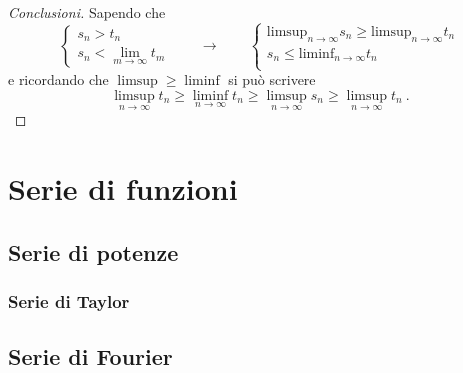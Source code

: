 \begin{proof}[Conclusioni]
Sapendo che
    \begin{equation}
        \begin{cases}
            s_n > t_n \\
            s_n < \lim_{m \rightarrow \infty} t_m
        \end{cases} \qquad \rightarrow \qquad
        \begin{cases}
            \text{limsup}_{n\rightarrow\infty} s_n \ge \text{limsup}_{n\rightarrow\infty} t_n \\
            s_n \le \text{liminf}_{n\rightarrow\infty} t_n \\
        \end{cases}
    \end{equation}
e ricordando che $\limsup \ge \liminf$ si può scrivere
\begin{equation}
    \limsup_{n\rightarrow\infty} t_n \ge \liminf_{n\rightarrow\infty} t_n \ge \limsup_{n\rightarrow\infty} s_n \ge \limsup_{n\rightarrow\infty} t_n \ .
\end{equation}
\end{proof}

\chapter{Serie di funzioni}
\section{Serie di potenze}
\subsection{Serie di Taylor}

\section{Serie di Fourier}\label{ch:fourier-series}

